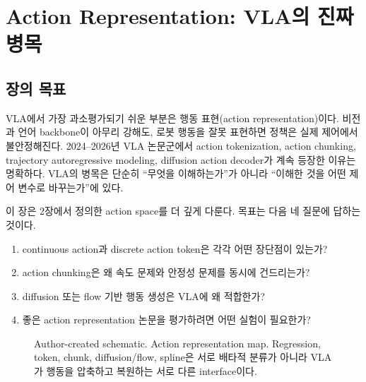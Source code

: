 \chapter{Action Representation: VLA의 진짜 병목}

\section{장의 목표}

VLA에서 가장 과소평가되기 쉬운 부분은 행동 표현(action representation)이다. 비전과 언어 backbone이 아무리 강해도, 로봇 행동을 잘못 표현하면 정책은 실제 제어에서 불안정해진다. 2024--2026년 VLA 논문군에서 action tokenization, action chunking, trajectory autoregressive modeling, diffusion action decoder가 계속 등장한 이유는 명확하다. VLA의 병목은 단순히 ``무엇을 이해하는가''가 아니라 ``이해한 것을 어떤 제어 변수로 바꾸는가''에 있다.

이 장은 2장에서 정의한 action space를 더 깊게 다룬다. 목표는 다음 네 질문에 답하는 것이다.

\begin{enumerate}
  \item continuous action과 discrete action token은 각각 어떤 장단점이 있는가?
  \item action chunking은 왜 속도 문제와 안정성 문제를 동시에 건드리는가?
  \item diffusion 또는 flow 기반 행동 생성은 VLA에 왜 적합한가?
  \item 좋은 action representation 논문을 평가하려면 어떤 실험이 필요한가?
\end{enumerate}

\begin{figure}[t]
  \centering
  \caption{Author-created schematic. Action representation map. Regression, token, chunk, diffusion/flow, spline은 서로 배타적 분류가 아니라 VLA가 행동을 압축하고 복원하는 서로 다른 interface이다.}
  \label{fig:action_representation_map}
\end{figure}


